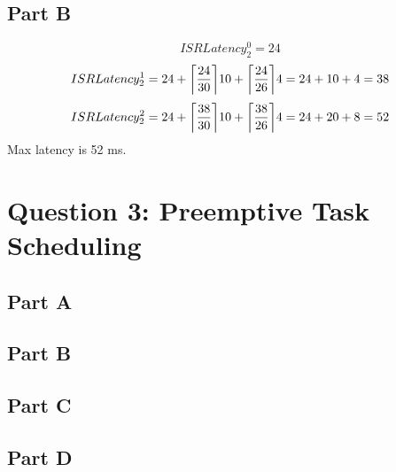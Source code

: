\documentclass{article}
\DeclarePairedDelimiter\ceil{\lceil}{\rceil}
\begin{document}
	\subsection*{Part B}
	$$ ISRLatency_2^0 = 24 $$
	$$ ISRLatency_2^1 = 24 + \ceil*{\frac{24}{30}}10+\ceil*{\frac{24}{26}}4=24+10+4=38$$
	$$ ISRLatency_2^2 = 24 + \ceil*{\frac{38}{30}}10+\ceil*{\frac{38}{26}}4=24+20+8=52$$
	Max latency is 52 ms.
	\section*{Question 3: Preemptive Task Scheduling}
	\subsection*{Part A}
	\subsection*{Part B}
	\subsection*{Part C}
	\subsection*{Part D}
\end{document}
